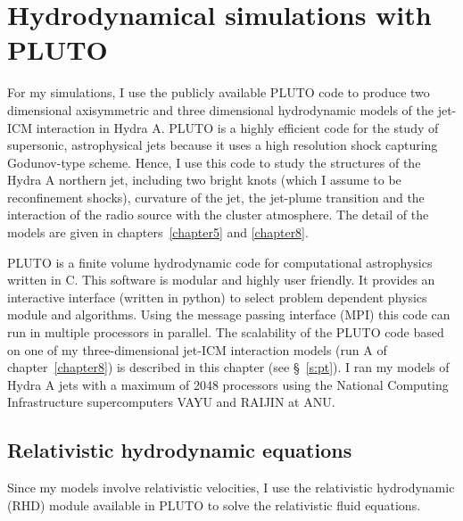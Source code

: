 \chapter{Hydrodynamical simulations with PLUTO} \label{chapter2}






For my simulations, I use the publicly available PLUTO code \citep{mignone07} to produce two dimensional axisymmetric and three dimensional hydrodynamic models of the jet-ICM interaction in Hydra A. 
PLUTO is a highly efficient code for the study of supersonic, astrophysical jets because it uses a high resolution shock capturing Godunov-type scheme. Hence, I use this code to study the structures of the Hydra A northern jet, including two bright knots (which I assume to be reconfinement shocks), curvature of the jet, the jet-plume transition and the interaction of the radio source with the cluster atmosphere. The detail of the models are given in chapters~\ref{chapter5} and \ref{chapter8}.

PLUTO is a finite volume hydrodynamic code for computational astrophysics written in C. This software is modular and highly user friendly. It provides an interactive interface (written in python) to select problem dependent physics module and algorithms. Using the message passing interface (MPI) this code can run in multiple processors in parallel. The scalability of the PLUTO code based on one of my three-dimensional jet-ICM interaction models (run A of chapter~\ref{chapter8}) is described in this chapter (see \S~\ref{s:pt}). I ran my models of Hydra A jets with a maximum of 2048 processors using the National Computing Infrastructure supercomputers VAYU and RAIJIN at ANU. 





\section{Relativistic hydrodynamic equations}
Since my models involve relativistic velocities, I use the relativistic hydrodynamic (RHD) module available in PLUTO to solve the relativistic fluid equations. 

